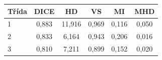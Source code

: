 \begin{tabular}{l c c c c c}
 \hline
Třída & DICE & HD & VS & MI & MHD \\ \hline
1 & 0,883 & 11,916 & 0,969 & 0,116 & 0,050 \\
2 & 0,833 & 6,164 & 0,943 & 0,206 & 0,016 \\
3 & 0,810 & 7,211 & 0,899 & 0,152 & 0,020 \\
\hline 
 \end{tabular}
